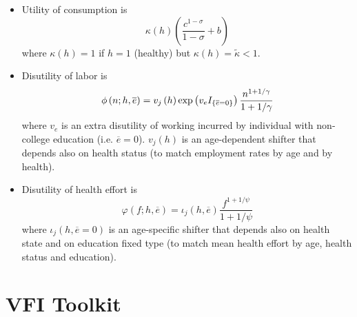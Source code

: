 \documentclass[12pt,a4paper]{article}
\begin{document}
\begin{itemize}
\begin{itemize}
\item Utility of consumption is%
\begin{equation*}
\kappa \left( h\right) \left( \frac{c^{1-\sigma }}{1-\sigma }+b\right) 
\end{equation*}%
where $\kappa \left( h\right) =1$ if $h=1$ (healthy) but $\kappa \left(
h\right) =\widetilde{\kappa }<1$.

\item Disutility of labor is%
\begin{equation*}
\phi \left( n;h,\overline{e}\right) =v_{j}\left( h\right) \exp \left(
v_{e}I_{\left\{ \overline{e}=0\right\} }\right) \frac{n^{1+1/\gamma }}{%
1+1/\gamma }
\end{equation*}%
where $v_{e}$ is an extra disutility of working incurred by individual with
non-college education (i.e. $\overline{e}=0$). $v_{j}\left( h\right) $ is an
age-dependent shifter that depends also on health status (to match
employment rates by age and by health).

\item Disutility of health effort is%
\begin{equation*}
\varphi \left( f;h,\overline{e}\right) =\iota _{j}\left( h,\overline{e}%
\right) \frac{f^{1+1/\psi }}{1+1/\psi }
\end{equation*}%
where $\iota _{j}\left( h,\overline{e}=0\right) $ is an age-specific shifter
that depends also on health state and on education fixed type (to match mean
health effort by age, health status and education).
\end{itemize}
\end{itemize}

\section{VFI Toolkit}
\end{document}
